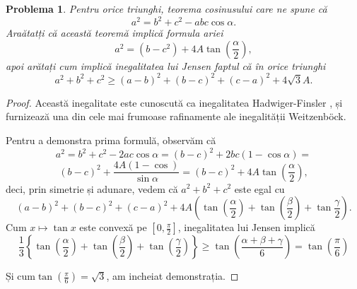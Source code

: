 \documentclass[a4paper,12pt,oneside]{report}
\newtheorem{problem}{Problema}
\begin{document}
\begin{problem}
Pentru orice triunghi, teorema cosinusului care ne spune că
\begin{displaymath}
  a^{2} = b^{2}+ c^{2} - abc\cos\alpha.
\end{displaymath}
Araătatți că această teoremă implică formula ariei
\begin{displaymath}
  a^{2} = \left ( b - c^{2} \right ) + 4 A\tan \left ( \frac{\alpha }{2} \right ),
\end{displaymath}
apoi arătați cum implică inegalitatea lui Jensen faptul că în orice triunghi
\begin{displaymath}
  a^{2} + b^{2} + c^{2} \geq  \left ( a - b  \right )^{2} + \left ( b- c  \right )^{2} + \left ( c - a \right )^{2} + 4\sqrt{3}A.
\end{displaymath}
\end{problem}
\begin{proof}
Această inegalitate este cunoscută ca inegalitatea Hadwiger-Finsler , și furnizează una din cele mai frumoase rafinamente ale inegalității Weitzenböck.

Pentru a demonstra prima formulă, observăm că
\begin{displaymath}
  a^{2} = b^{2} + c^{2} - 2ac\cos\alpha  = \left (  b - c \right )^{2} + 2bc\left ( 1 - \cos\alpha  \right )=
\end{displaymath}
\begin{displaymath}
 \left ( b - c \right )^{2} + \frac{4A\left ( 1 - \cos  \right )}{\sin \alpha } = \left ( b - c \right )^{2} + 4A\tan\left ( \frac{\alpha }{2} \right ),
\end{displaymath}
deci, prin simetrie și adunare, vedem că
\(a^{2} + b^{2} + c^{2}\) este egal cu
\begin{displaymath}
  \left ( a - b  \right )^{2} + \left ( b - c \right )^{2} + \left ( c - a  \right )^{2} + 4A\left ( \tan\left ( \frac{\alpha }{2} \right ) + \tan\left ( \frac{\beta }{2} \right ) + \tan \frac{\gamma }{2} \right ).
\end{displaymath}
	Cum \(x \mapsto \tan x\) este convexă pe \(\left [ 0 , \frac{\pi }{2} \right ]\), inegalitatea lui Jensen implică
\begin{displaymath}
  \frac{1}{3}\left \{ \tan \left ( \frac{\alpha }{2} \right ) + \tan \left ( \frac{\beta }{2} \right )  + \tan \left ( \frac{\gamma }{2} \right )\right \} \geq  \tan\left ( \frac{\alpha  + \beta  + \gamma }{6} \right ) = \tan \left ( \frac{\pi }{6} \right)
\end{displaymath}

Și cum\(\tan \left ( \frac{\pi }{6} \right ) = \sqrt{3}\),  am incheiat demonstrația.
\end{proof}
\end{document}
